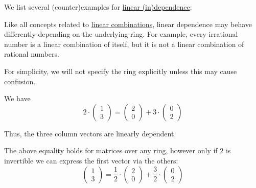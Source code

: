 \begin{example}\label{ex:def:linear_dependence}
  We list several (counter)examples for \hyperref[def:linear_dependence]{linear (in)dependence}:
  \begin{thmenum}
     Like all concepts related to \hyperref[def:linear_combination]{linear combinations}, linear dependence may behave differently depending on the underlying ring. For example, every irrational number is a linear combination of itself, but it is not a linear combination of rational numbers.

    For simplicity, we will not specify the ring explicitly unless this may cause confusion.

     We have
    \begin{equation*}
      2 \cdot
      \begin{pmatrix}
        1 \\ 3
      \end{pmatrix}
      =
      \begin{pmatrix}
        2 \\ 0
      \end{pmatrix}
      +
      3 \cdot
      \begin{pmatrix}
        0 \\ 2
      \end{pmatrix}
    \end{equation*}

    Thus, the three column vectors are linearly dependent.

    The above equality holds for matrices over any ring, however only if \( 2 \) is invertible we can express the first vector via the others:
    \begin{equation*}
      \begin{pmatrix}
        1 \\ 3
      \end{pmatrix}
      =
      \frac 1 2 \cdot
      \begin{pmatrix}
        2 \\ 0
      \end{pmatrix}
      +
      \frac 3 2 \cdot
      \begin{pmatrix}
        0 \\ 2
      \end{pmatrix}
    \end{equation*}
  \end{thmenum}
\end{example}

